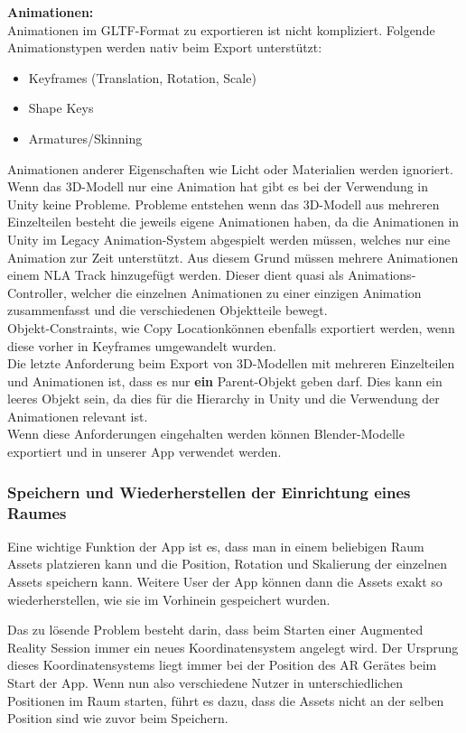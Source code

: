 \documentclass[titlepage, a4paper, 11pt]{scrartcl}
\begin{document}
  \textbf{Animationen:}\\
  Animationen im GLTF-Format zu exportieren ist nicht kompliziert. Folgende Animationstypen werden nativ beim Export unterstützt:
  \begin{itemize}
  \item Keyframes (Translation, Rotation, Scale)
  \item Shape Keys
  \item Armatures/Skinning
  \end{itemize}
  Animationen anderer Eigenschaften wie Licht oder Materialien werden ignoriert.\\
  Wenn das 3D-Modell nur eine Animation hat gibt es bei der Verwendung in Unity keine Probleme. Probleme entstehen wenn das 3D-Modell aus mehreren Einzelteilen besteht die jeweils eigene Animationen haben, da die Animationen in Unity im Legacy Animation-System abgespielt werden müssen, welches nur eine Animation zur Zeit unterstützt. Aus diesem Grund müssen mehrere Animationen einem NLA Track hinzugefügt werden. Dieser dient quasi als Animations-Controller, welcher die einzelnen Animationen zu einer einzigen Animation zusammenfasst und die verschiedenen Objektteile bewegt.\\
  Objekt-Constraints, wie \glqq Copy Location\grqq können ebenfalls exportiert werden, wenn diese vorher in Keyframes umgewandelt wurden.\\
  Die letzte Anforderung beim Export von 3D-Modellen mit mehreren Einzelteilen und Animationen ist, dass es nur \textbf{ein} Parent-Objekt geben darf. Dies kann ein leeres Objekt sein, da dies für die Hierarchy in Unity und die Verwendung der Animationen relevant ist.\\

  Wenn diese Anforderungen eingehalten werden können Blender-Modelle exportiert und in unserer App verwendet werden.

  \subsubsection{Speichern und Wiederherstellen der Einrichtung eines Raumes}

  Eine wichtige Funktion der App ist es, dass man in einem beliebigen Raum Assets platzieren kann und die Position, Rotation und Skalierung der einzelnen Assets speichern kann.
  Weitere User der App können dann die Assets exakt so wiederherstellen, wie sie im Vorhinein gespeichert wurden.

  Das zu lösende Problem besteht darin, dass beim Starten einer Augmented Reality Session immer ein neues Koordinatensystem angelegt wird.
  Der Ursprung dieses Koordinatensystems liegt immer bei der Position des AR Gerätes beim Start der App.
  Wenn nun also verschiedene Nutzer in unterschiedlichen Positionen im Raum starten, führt es dazu, dass die Assets nicht an der selben Position sind wie zuvor beim Speichern.
  
\end{document}
